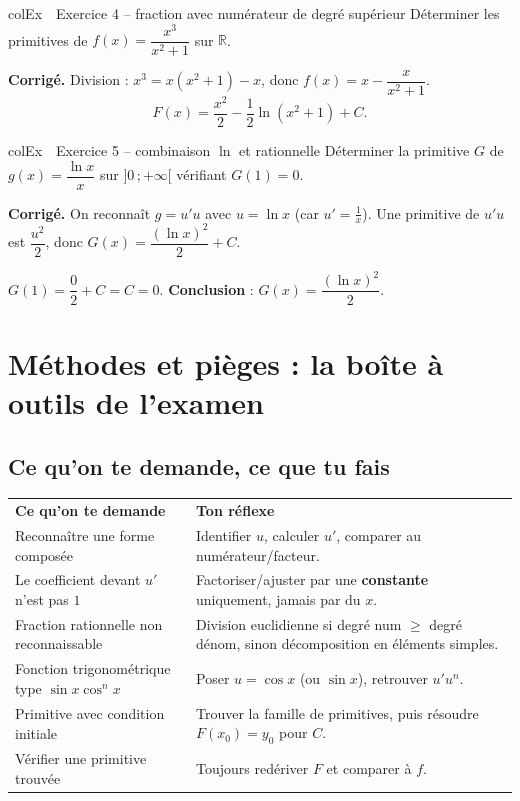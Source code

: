 \documentclass[11pt,a4paper]{article}
\newenvironment{exemple}[1][Exemple]
  {\begin{fiche}{colEx}{\ding{217}~~#1}}{\end{fiche}}
\begin{document}
\begin{exemple}[Exercice 4 -- fraction avec numérateur de degré supérieur]
Déterminer les primitives de $f(x)=\dfrac{x^3}{x^2+1}$ sur $\mathbb{R}$.

\smallskip
\textbf{Corrigé.} Division : $x^3 = x(x^2+1)-x$, donc $f(x)=x-\dfrac{x}{x^2+1}$.
\[
  F(x) = \frac{x^2}{2}-\frac12\ln(x^2+1)+C.
\]
\end{exemple}

\begin{exemple}[Exercice 5 -- combinaison $\ln$ et rationnelle]
Déterminer la primitive $G$ de $g(x)=\dfrac{\ln x}{x}$ sur $]0\,;+\infty[$ vérifiant $G(1)=0$.

\smallskip
\textbf{Corrigé.} On reconnaît $g=u'u$ avec $u=\ln x$ (car $u'=\frac1x$). Une primitive de $u'u$ est $\dfrac{u^2}{2}$, donc $G(x)=\dfrac{(\ln x)^2}{2}+C$.

\smallskip
$G(1)=\dfrac{0}{2}+C=C=0$. \textbf{Conclusion} : $G(x)=\dfrac{(\ln x)^2}{2}$.
\end{exemple}

\section{Méthodes et pièges : la boîte à outils de l'examen}

\subsection{Ce qu'on te demande, ce que tu fais}

\begin{center}
\renewcommand{\arraystretch}{1.45}
\sffamily\small
\begin{tabular}{>{\raggedright\arraybackslash}p{7.2cm} >{\raggedright\arraybackslash}p{8cm}}
\rowcolor{qtealdark} \color{white}\bfseries Ce qu'on te demande & \color{white}\bfseries Ton réflexe \\
\rowcolor{tealpale} Reconnaître une forme composée & Identifier $u$, calculer $u'$, comparer au numérateur/facteur. \\
Le coefficient devant $u'$ n'est pas $1$ & Factoriser/ajuster par une \textbf{constante} uniquement, jamais par du $x$. \\
\rowcolor{tealpale} Fraction rationnelle non reconnaissable & Division euclidienne si degré num $\geq$ degré dénom, sinon décomposition en éléments simples. \\
Fonction trigonométrique type $\sin x\cos^nx$ & Poser $u=\cos x$ (ou $\sin x$), retrouver $u'u^n$. \\
\rowcolor{tealpale} Primitive avec condition initiale & Trouver la famille de primitives, puis résoudre $F(x_0)=y_0$ pour $C$. \\
Vérifier une primitive trouvée & Toujours redériver $F$ et comparer à $f$. \\
\end{tabular}
\end{center}
\end{document}
